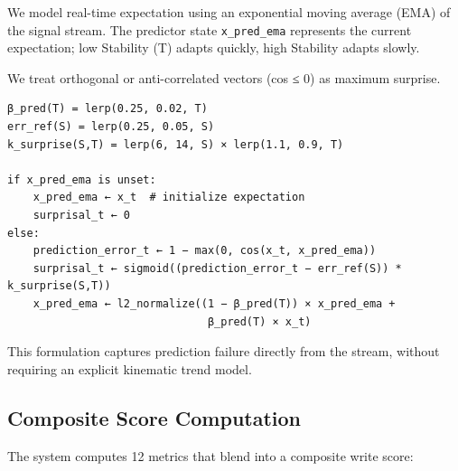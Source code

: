 \documentclass[
  letterpaper,
  DIV=11,
  numbers=noendperiod]{scrartcl}
\begin{document}
We model real-time expectation using an exponential moving average (EMA)
of the signal stream. The predictor state \texttt{x\_pred\_ema}
represents the current expectation; low Stability (T) adapts quickly,
high Stability adapts slowly.

We treat orthogonal or anti-correlated vectors (cos ≤ 0) as maximum
surprise.

\begin{verbatim}
β_pred(T) = lerp(0.25, 0.02, T)
err_ref(S) = lerp(0.25, 0.05, S)
k_surprise(S,T) = lerp(6, 14, S) × lerp(1.1, 0.9, T)

if x_pred_ema is unset:
    x_pred_ema ← x_t  # initialize expectation
    surprisal_t ← 0
else:
    prediction_error_t ← 1 − max(0, cos(x_t, x_pred_ema))
    surprisal_t ← sigmoid((prediction_error_t − err_ref(S)) * k_surprise(S,T))
    x_pred_ema ← l2_normalize((1 − β_pred(T)) × x_pred_ema +
                               β_pred(T) × x_t)
\end{verbatim}

This formulation captures prediction failure directly from the stream,
without requiring an explicit kinematic trend model.

\subsection{Composite Score
Computation}\label{composite-score-computation}

The system computes 12 metrics that blend into a composite write score:
\end{document}
